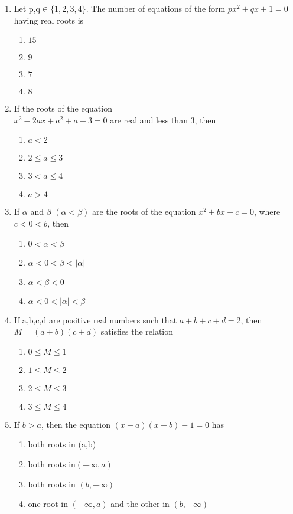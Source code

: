 \begin{enumerate}[label=\arabic*.,ref=\thesubsection.\theenumi]
\item Let p,q$\in\{1,2,3,4\} $. The number of equations of the form $px^{2}+qx+1=0$ having real roots is
\begin{enumerate}
\item $15$
\item $9$ 
\item $7$
\item $8$ 
\end{enumerate}

\item If the roots of the equation\\ $x^{2}-2ax+a^{2}+a-3=0$ are real and less than 3, then
\begin{enumerate}
\item $a<2$
\item $2\leq{a}\leq{3}$ 
\item $3<a\leq{4}$
\item $a>4$ 
\end{enumerate}

\item If $\alpha$ and $\beta$ $(\alpha<\beta)$ are the roots of the equation $x^{2}+bx+c=0$, where $c<0<b$, then
\begin{enumerate}
\item $0<\alpha<\beta$
\item $\alpha<0<\beta<|\alpha|$ 
\item $\alpha<\beta<0$
\item $\alpha<0<|\alpha|<\beta$
\end{enumerate}

\item If a,b,c,d are positive real numbers such that $a+b+c+d=2$, then $M=(a+b)(c+d)$ satisfies the relation 
\begin{enumerate}
\item $0\leq{M}\leq1$
\item $1\leq{M}\leq2$ 
\item $2\leq{M}\leq3$
\item $3\leq{M}\leq4$
\end{enumerate}

\item If $b>a$, then the equation $(x-a)(x-b)-1=0$ has 
\begin{enumerate}
\item both roots in (a,b)
\item both roots in$(-\infty,a)$ 
\item both roots in $(b,+\infty)$
\item one root in $(-\infty,a)$ and the other in $(b,+\infty)$
\end{enumerate}


\end{enumerate}
